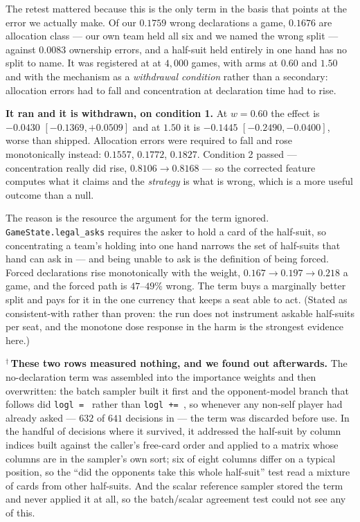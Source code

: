 \documentclass[11pt,a4paper]{article}
\begin{document}
The retest mattered because this is the only term in the basis that points at
the error we actually make. Of our $0.1759$ wrong declarations a game, $0.1676$
are allocation class --- our own team held all six and we named the wrong split
--- against $0.0083$ ownership errors, and a half-suit held entirely in one
hand has no split to name. It was registered at
 at $4{,}000$ games, with arms at $0.60$ and
$1.50$ and with the mechanism as a \emph{withdrawal condition} rather than a
secondary: allocation errors had to fall and concentration at declaration time
had to rise.

\textbf{It ran and it is withdrawn, on condition 1.} At $w = 0.60$ the effect is
$-0.0430$ $[-0.1369, +0.0509]$ and at $1.50$ it is $-0.1445$ $[-0.2490,
-0.0400]$, worse than shipped. Allocation errors were required to fall and rose
monotonically instead: $0.1557$, $0.1772$, $0.1827$. Condition 2 passed ---
concentration really did rise, $0.8106 \to 0.8168$ --- so the corrected feature
computes what it claims and the \emph{strategy} is what is wrong, which is a
more useful outcome than a null.

The reason is the resource the argument for the term ignored.
\texttt{GameState.legal\_asks} requires the asker to hold a card of the
half-suit, so concentrating a team's holding into one hand narrows the set of
half-suits that hand can ask in --- and being unable to ask is the definition of
being forced. Forced declarations rise monotonically with the weight, $0.167 \to
0.197 \to 0.218$ a game, and the forced path is $47$--$49\%$ wrong. The term
buys a marginally better split and pays for it in the one currency that keeps a
seat able to act. (Stated as consistent-with rather than proven: the run does
not instrument askable half-suits per seat, and the monotone dose response in
the harm is the strongest evidence here.)

$^\dagger$\,\textbf{These two rows measured nothing, and we found out
afterwards.} The no-declaration term was assembled into the importance weights
and then overwritten: the batch sampler built it first and the opponent-model
branch that follows did \texttt{logl = } rather than \texttt{logl += }, so
whenever any non-self player had already asked --- $632$ of $641$ decisions in
 --- the term was discarded before use. In the
handful of decisions where it survived, it addressed the half-suit by column
indices built against the caller's free-card order and applied to a matrix whose
columns are in the sampler's own sort; six of eight columns differ on a typical
position, so the ``did the opponents take this whole half-suit'' test read a
mixture of cards from other half-suits. And the scalar reference sampler stored
the term and never applied it at all, so the batch/scalar agreement test could
not see any of this.
\end{document}
